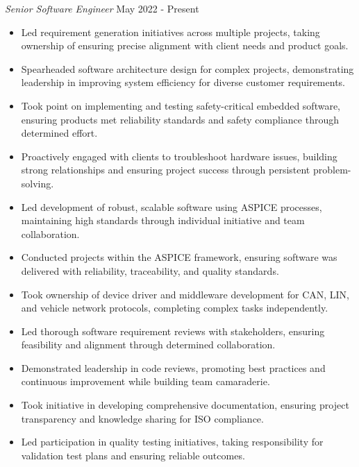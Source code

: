 \noindent
\textit{Senior Software Engineer} \hfill May 2022 - Present \\
\begin{itemize}[leftmargin=*,noitemsep,topsep=3pt]
    \item Led requirement generation initiatives across multiple projects, taking ownership of ensuring precise alignment with client needs and product goals.
    \item Spearheaded software architecture design for complex projects, demonstrating leadership in improving system efficiency for diverse customer requirements.
    \item Took point on implementing and testing safety-critical embedded software, ensuring products met reliability standards and safety compliance through determined effort.
    \item Proactively engaged with clients to troubleshoot hardware issues, building strong relationships and ensuring project success through persistent problem-solving.
    \item Led development of robust, scalable software using ASPICE processes, maintaining high standards through individual initiative and team collaboration.
    \item Conducted projects within the ASPICE framework, ensuring software was delivered with reliability, traceability, and quality standards.
    \item Took ownership of device driver and middleware development for CAN, LIN, and vehicle network protocols, completing complex tasks independently.
    \item Led thorough software requirement reviews with stakeholders, ensuring feasibility and alignment through determined collaboration.
    \item Demonstrated leadership in code reviews, promoting best practices and continuous improvement while building team camaraderie.
    \item Took initiative in developing comprehensive documentation, ensuring project transparency and knowledge sharing for ISO compliance.
    \item Led participation in quality testing initiatives, taking responsibility for validation test plans and ensuring reliable outcomes.
\end{itemize}